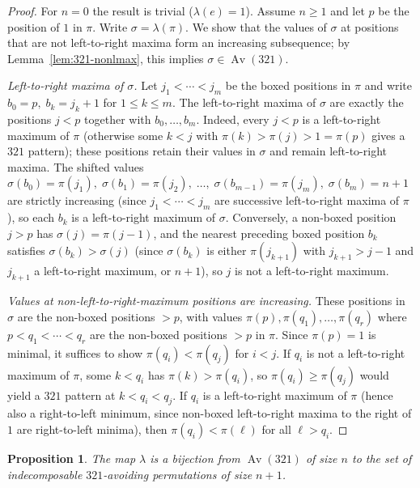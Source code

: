 \documentclass[a4paper,11pt]{article}
\newtheorem{proposition}[theorem]{Proposition}
\theoremstyle{definition}
\DeclareMathOperator{\Av}{Av}
\begin{document}
\begin{proof}
For $n = 0$ the result is trivial
($\lambda(e) = 1$). Assume $n \geq 1$ and let $p$ be
the position of $1$ in $\pi$. Write
$\sigma = \lambda(\pi)$. We show that the values of
$\sigma$ at positions that are not left-to-right
maxima form an increasing subsequence; by
Lemma~\ref{lem:321-nonlmax}, this implies
$\sigma \in \Av(321)$.

\emph{Left-to-right maxima of $\sigma$.} Let
$j_1 < \cdots < j_m$ be the boxed positions in $\pi$
and write $b_0 = p,\; b_k = j_k + 1$ for
$1 \leq k \leq m$. The left-to-right maxima of $\sigma$
are exactly the positions $j < p$ together with
$b_0, \ldots, b_m$. Indeed, every $j < p$ is a
left-to-right maximum of $\pi$ (otherwise some
$k < j$ with $\pi(k) > \pi(j) > 1 = \pi(p)$ gives a
$321$ pattern); these positions retain their values
in $\sigma$ and remain left-to-right maxima. The
shifted values
$\sigma(b_0) = \pi(j_1),\; \sigma(b_1) = \pi(j_2),
\;\ldots,\; \sigma(b_{m-1}) = \pi(j_m),\;
\sigma(b_m) = n{+}1$ are strictly increasing (since
$j_1 < \cdots < j_m$ are successive left-to-right
maxima of $\pi$), so each $b_k$ is a left-to-right
maximum of $\sigma$.
Conversely, a non-boxed position $j > p$ has
$\sigma(j) = \pi(j{-}1)$, and the nearest preceding
boxed position $b_k$ satisfies
$\sigma(b_k) > \sigma(j)$ (since $\sigma(b_k)$ is
either $\pi(j_{k+1})$ with $j_{k+1} > j{-}1$ and
$j_{k+1}$ a left-to-right maximum, or $n{+}1$), so
$j$ is not a left-to-right maximum.

\emph{Values at non-left-to-right-maximum positions
are increasing.} These positions in $\sigma$ are the
non-boxed positions $> p$, with values
$\pi(p), \pi(q_1), \ldots, \pi(q_r)$ where
$p < q_1 < \cdots < q_r$ are the non-boxed positions
$> p$ in $\pi$. Since $\pi(p) = 1$ is minimal, it
suffices to show $\pi(q_i) < \pi(q_j)$ for $i < j$.
If $q_i$ is not a left-to-right maximum of $\pi$,
some $k < q_i$ has $\pi(k) > \pi(q_i)$, so
$\pi(q_i) \geq \pi(q_j)$ would yield a $321$ pattern
at $k < q_i < q_j$. If $q_i$ is a left-to-right
maximum of $\pi$ (hence also a right-to-left minimum,
since non-boxed left-to-right maxima to the right of
$1$ are right-to-left minima), then
$\pi(q_i) < \pi(\ell)$ for all $\ell > q_i$.
\end{proof}

\begin{proposition}\label{prop:321-bijectivity}
The map $\lambda$ is a bijection from $\Av(321)$ of
size $n$ to the set of indecomposable $321$-avoiding
permutations of size $n{+}1$.
\end{proposition}
\end{document}
